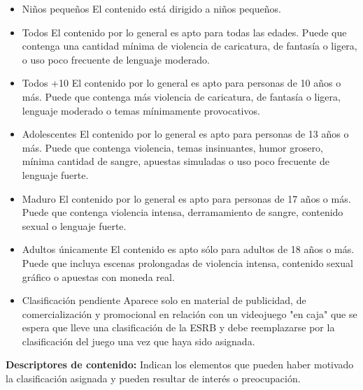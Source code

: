 			\begin{itemize}
			\item Niños pequeños
			El contenido está dirigido a niños pequeños.
			
			\item Todos
			El contenido por lo general es apto para todas las edades. Puede que contenga una cantidad mínima de violencia de caricatura, de fantasía o ligera, o uso poco frecuente de lenguaje moderado.
			
			\item Todos +10
			El contenido por lo general es apto para personas de 10 años o más. Puede que contenga más violencia de caricatura, de fantasía o ligera, lenguaje moderado o temas mínimamente provocativos.
			
			\item Adolescentes
			El contenido por lo general es apto para personas de 13 años o más. Puede que contenga violencia, temas insinuantes, humor grosero, mínima cantidad de sangre, apuestas simuladas o uso poco frecuente de lenguaje fuerte.
			
			\item Maduro
			El contenido por lo general es apto para personas de 17 años o más. Puede que contenga violencia intensa, derramamiento de sangre, contenido sexual o lenguaje fuerte.
			
			\item Adultos únicamente
			El contenido es apto sólo para adultos de 18 años o más. Puede que incluya escenas prolongadas de violencia intensa, contenido sexual gráfico o apuestas con moneda real.
			
			\item Clasificación pendiente
			Aparece solo en material de publicidad, de comercialización y promocional en relación con un videojuego "en caja" que se espera que lleve una clasificación de la ESRB y debe reemplazarse por la clasificación del juego una vez que haya sido asignada.
			
		\end{itemize}		
			
			\textbf{Descriptores de contenido: } 
			Indican los elementos que pueden haber motivado la clasificación asignada y pueden resultar de interés o preocupación.
			\\[1pt]
			
